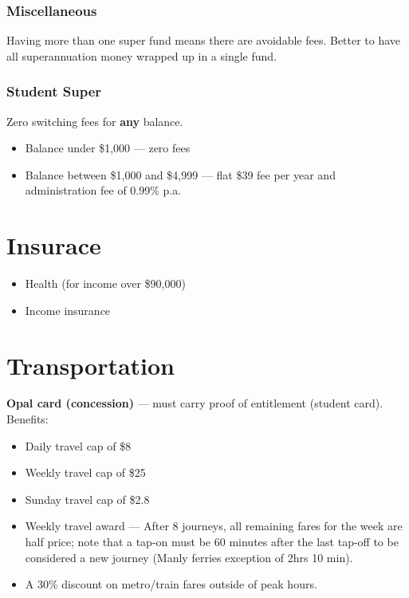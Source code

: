 \subsubsection{Miscellaneous}
Having more than one super fund means there are avoidable fees. Better to have all superannuation money wrapped up in a single fund.

\subsubsection{Student Super}
Zero switching fees for \textbf{any} balance.
\begin{itemize}
	\item Balance under \$1,000 --- zero fees
	\item Balance between \$1,000 and \$4,999 --- flat \$39 fee per year and administration fee of 0.99\% p.a.
\end{itemize}

\section{Insurace}
\begin{itemize}
	\item Health (for income over \$90,000)
	\item Income insurance
\end{itemize}

\section{Transportation}

\textbf{Opal card (concession)} --- must carry proof of entitlement (student card). Benefits:

\begin{itemize}
	\item Daily travel cap of \$8
	\item Weekly travel cap of \$25
	\item Sunday travel cap of \$2.8
	\item Weekly travel award --- After 8 journeys, all remaining fares for the week are half price; note that a tap-on must be 60 minutes after the last tap-off to be considered a new journey (Manly ferries exception of 2hrs 10 min).
	\item A 30\% discount on metro/train fares outside of peak hours.
\end{itemize}